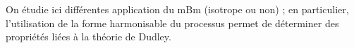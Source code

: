 
On étudie ici différentes application du mBm (isotrope ou non) ; en
particulier, l'utilisation de la forme harmonisable du processus
permet de déterminer des propriétés liées à la théorie de Dudley.